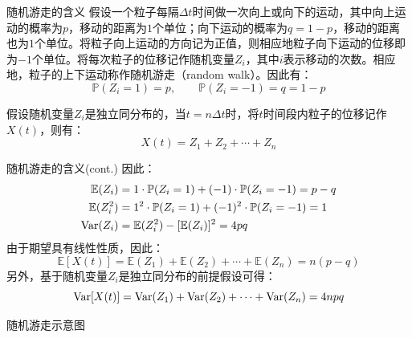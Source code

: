 \documentclass[t]{beamer}
\renewcommand{\Pr}{\mathbb{P}}
\newcommand{\E}{\mathbb{E}}
\newcommand{\Var}{{\rm Var}}
\begin{document}
\begin{frame}{随机游走的含义}
  假设一个粒子每隔$\Delta t$时间做一次向上或向下的运动，其中向上运动的概率为$p$，移动的距离为$1$个单位；向下运动的概率为$q=1-p$，移动的距离也为$1$个单位。将粒子向上运动的方向记为正值，则相应地粒子向下运动的位移即为$-1$个单位。将每次粒子的位移记作随机变量$Z_i$，其中$i$表示移动的次数。相应地，粒子的上下运动称作随机游走（random walk）。因此有：
  \begin{equation*}
  \Pr(Z_i=1)=p,\qquad \Pr(Z_i=-1)=q=1-p
  \end{equation*}
  
  假设随机变量$Z_i$是独立同分布的，当$t=n\Delta t$时，将$t$时间段内粒子的位移记作$X(t)$，则有：
  \begin{equation*}
  X(t)=Z_1+Z_2+\cdots +Z_n
  \end{equation*}
\end{frame}


\begin{frame}{随机游走的含义(cont.)}
  因此：\[\begin{split}
    \E(Z_i)&=1 \cdot \Pr(Z_i=1)+(-1)\cdot \Pr(Z_i=-1)=p-q\\
    \E(Z_i^2)&=1^2 \cdot \Pr(Z_i=1)+(-1)^2\cdot \Pr(Z_i=-1)=1\\
    \Var(Z_i)&=\E(Z_i^2)-[\E(Z_i)]^2=4pq
    \end{split}
    \]
    由于期望具有线性性质，因此：
\begin{equation*}
\E[X(t)]=\E(Z_1)+\E(Z_2)+\cdots +\E(Z_n)=n(p-q)
\end{equation*}
另外，基于随机变量$Z_i$是独立同分布的前提假设可得：
\begin{equation*}
\Var[X(t)]=\Var(Z_1)+\Var(Z_2)+\cdots +\Var(Z_n)=4npq
\end{equation*}
\end{frame}


\begin{frame}{随机游走示意图}
  \centering
\end{frame}
\end{document}
